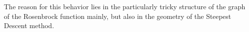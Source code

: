 \begin{example}
\begin{itemize}[nosep]
\end{itemize}
The reason for this behavior lies in the particularly tricky structure of the graph of the Rosenbrock function mainly, but also in the geometry of the Steepest Descent method.
\end{example}
